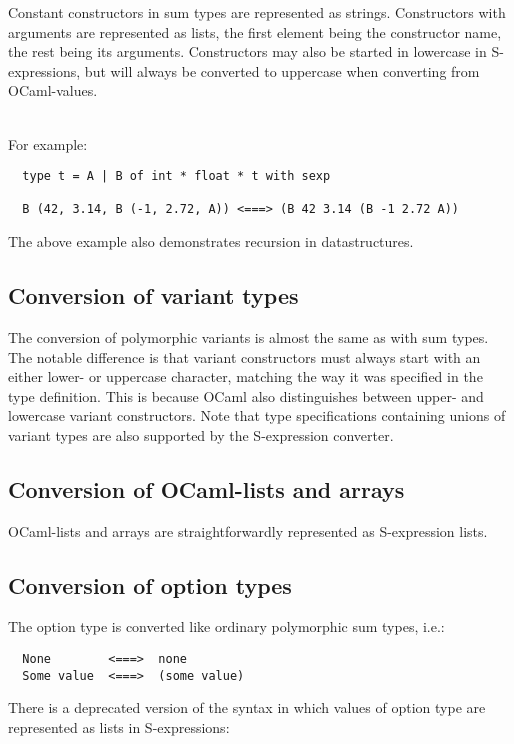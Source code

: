 \documentclass[a4paper]{article}
\begin{document}
Constant constructors in sum types are represented as strings.
Constructors with arguments are represented as lists, the first element
being the constructor name, the rest being its arguments.  Constructors
may also be started in lowercase in S-expressions, but will always be
converted to uppercase when converting from OCaml-values.\\
\\
{\samepage
\noindent For example:

\begin{verbatim}
  type t = A | B of int * float * t with sexp

  B (42, 3.14, B (-1, 2.72, A)) <===> (B 42 3.14 (B -1 2.72 A))
\end{verbatim}

\noindent The above example also demonstrates recursion in datastructures.
}

\subsection{Conversion of variant types}

The conversion of polymorphic variants is almost the same as with
sum types.  The notable difference is that variant constructors must
always start with an either lower- or uppercase character, matching
the way it was specified in the type definition.  This is because OCaml
also distinguishes between upper- and lowercase variant constructors.
Note that type specifications containing unions of variant types are
also supported by the S-expression converter.

\subsection{Conversion of OCaml-lists and arrays}

OCaml-lists and arrays are straightforwardly represented as S-expression
lists.

\subsection{Conversion of option types}

The option type is converted like ordinary polymorphic sum types, i.e.:

\begin{verbatim}
  None        <===>  none
  Some value  <===>  (some value)
\end{verbatim}

There is a deprecated version of the syntax in which values of option
type are represented as lists in S-expressions:
\end{document}
